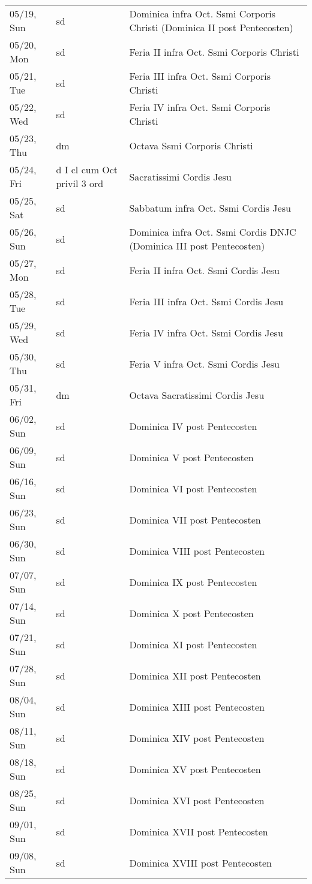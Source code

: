 \documentclass{article}
\begin{document}
\begin{longtable}{ l l l }
05/19, Sun & sd & Dominica infra Oct. Ssmi Corporis Christi (Dominica II post Pentecosten)\\
05/20, Mon & sd & Feria II infra Oct. Ssmi Corporis Christi\\
05/21, Tue & sd & Feria III infra Oct. Ssmi Corporis Christi\\
05/22, Wed & sd & Feria IV infra Oct. Ssmi Corporis Christi\\
05/23, Thu & dm & Octava Ssmi Corporis Christi\\
05/24, Fri & d I cl cum Oct privil 3 ord & Sacratissimi Cordis Jesu\\
05/25, Sat & sd & Sabbatum infra Oct. Ssmi Cordis Jesu\\
05/26, Sun & sd & Dominica infra Oct. Ssmi Cordis DNJC (Dominica III post Pentecosten)\\
05/27, Mon & sd & Feria II infra Oct. Ssmi Cordis Jesu\\
05/28, Tue & sd & Feria III infra Oct. Ssmi Cordis Jesu\\
05/29, Wed & sd & Feria IV infra Oct. Ssmi Cordis Jesu\\
05/30, Thu & sd & Feria V infra Oct. Ssmi Cordis Jesu\\
05/31, Fri & dm & Octava Sacratissimi Cordis Jesu\\
06/02, Sun & sd & Dominica IV post Pentecosten\\
06/09, Sun & sd & Dominica V post Pentecosten\\
06/16, Sun & sd & Dominica VI post Pentecosten\\
06/23, Sun & sd & Dominica VII post Pentecosten\\
06/30, Sun & sd & Dominica VIII post Pentecosten\\
07/07, Sun & sd & Dominica IX post Pentecosten\\
07/14, Sun & sd & Dominica X post Pentecosten\\
07/21, Sun & sd & Dominica XI post Pentecosten\\
07/28, Sun & sd & Dominica XII post Pentecosten\\
08/04, Sun & sd & Dominica XIII post Pentecosten\\
08/11, Sun & sd & Dominica XIV post Pentecosten\\
08/18, Sun & sd & Dominica XV post Pentecosten\\
08/25, Sun & sd & Dominica XVI post Pentecosten\\
09/01, Sun & sd & Dominica XVII post Pentecosten\\
09/08, Sun & sd & Dominica XVIII post Pentecosten\\

\end{longtable}
\end{document}
